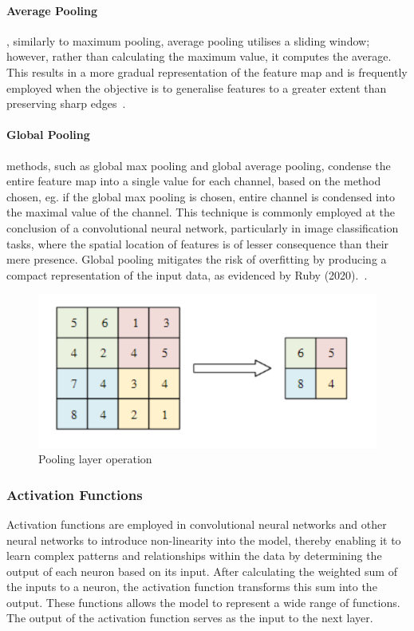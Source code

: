 \paragraph{Average Pooling}
, similarly to maximum pooling, average pooling utilises a sliding window; however, rather than
calculating the maximum value, it computes the average. This results in a more gradual
representation of the feature map and is frequently employed when the objective is to generalise
features to a greater extent than preserving sharp edges~\cite{GU2018354}.


\paragraph{Global Pooling}
methods, such as global max pooling and global average pooling, condense the entire feature map into a single value for each channel,
based on the method chosen, eg. if the global max pooling is chosen, entire channel is condensed into the maximal value of the channel.
This technique is commonly employed at the conclusion of a convolutional neural network, particularly in image classification tasks, where the spatial location of features is of lesser consequence than their mere presence. Global pooling mitigates the risk of overfitting by producing a compact representation of the input data, as evidenced by Ruby (2020).~\cite{GU2018354}.


\begin{figure}[h]
\centering
\includegraphics[width=.50\textwidth]{figures/pooling}
\caption{Pooling layer operation~\cite{article}}
\label{fig:pooling}
\end{figure}



\subsubsection{Activation Functions}\label{subsec:activation-functions}

Activation functions are employed in convolutional neural networks and other neural networks to introduce non-linearity into the model,
thereby enabling it to learn complex patterns and relationships within the data by determining the output of each neuron based on its input.
After calculating the weighted sum of the inputs to a neuron, the activation function transforms this sum into the output. These functions allows the model to represent a wide range of functions.
The output of the activation function serves as the input to the next layer.

